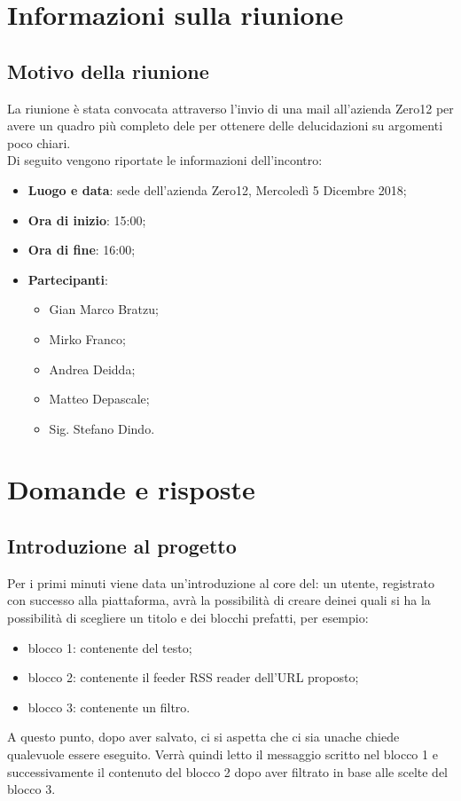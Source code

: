 \documentclass[a4paper,12pt]{article}
\begin{document}
	\cleardoublepage
	\pagestyle{mymain}
	
	\tableofcontents
	\cleardoublepage
	
	\section{Informazioni sulla riunione}
	\subsection{Motivo della riunione}
	La riunione è stata convocata attraverso l'invio di una mail all'azienda Zero12 per avere un quadro più completo dele per ottenere delle delucidazioni su argomenti poco chiari. \\
	Di seguito vengono riportate le informazioni dell'incontro:
	\begin{itemize}
		\item \textbf{Luogo e data}: sede dell'azienda Zero12, Mercoledì 5 Dicembre 2018;
		\item \textbf{Ora di inizio}: 15:00;
		\item \textbf{Ora di fine}: 16:00;
		\item \textbf{Partecipanti}: 
		\begin{itemize}
		\item Gian Marco Bratzu;
		\item Mirko Franco;
		\item Andrea Deidda;
		\item Matteo Depascale;
		\item Sig. Stefano Dindo.
		\end{itemize}
	\end{itemize}

	\section{Domande e risposte}
	\subsection{Introduzione al progetto}
	Per i primi minuti viene data un'introduzione al core del: un utente, registrato con successo alla piattaforma, avrà la possibilità di creare deinei quali si ha  la possibilità di scegliere un titolo e  dei blocchi prefatti, per esempio:
	\begin{itemize}
		\item blocco 1: contenente del testo;
		\item blocco 2: contenente il feeder RSS reader dell'URL proposto;
		\item blocco 3: contenente un filtro.
	\end{itemize}
	A questo punto, dopo aver salvato, ci si aspetta che ci sia unache chiede qualevuole essere eseguito. Verrà quindi letto il messaggio scritto nel blocco 1 e successivamente il contenuto del blocco 2 dopo aver filtrato in base alle scelte del blocco 3.
	
\end{document}
